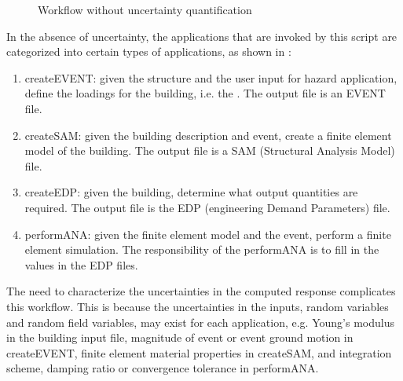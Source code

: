 \begin{figure}[!htbp]
  \caption{Workflow without uncertainty quantification}
  \label{fig:figure17}
\end{figure}


In the absence of uncertainty, the applications that are invoked by
this script are categorized into certain types of applications, as shown 
in :
\begin{enumerate}
\item createEVENT: given the structure and the user input for hazard
  application, define the loadings for the building, i.e. the
  . The output
  file is an EVENT file.
\item createSAM: given the building description and event, create a
  finite element model of the building. The output file is a SAM
  (Structural Analysis Model) file.
\item createEDP: given the building, determine what output quantities
  are required. The output file is the EDP (engineering Demand
  Parameters) file.
\item performANA: given the finite element model and the event,
  perform a finite element simulation. The responsibility of the
  performANA is to fill in the values in the EDP files.
\end{enumerate}


The need to characterize the uncertainties in the computed response
complicates this workflow. This is because the uncertainties in the
inputs, random variables and random field variables, may exist for
each application, e.g. Young’s modulus in the building input file,
magnitude of event or event ground motion in createEVENT, finite
element material properties in createSAM, and integration scheme,
damping ratio or convergence tolerance in performANA.

